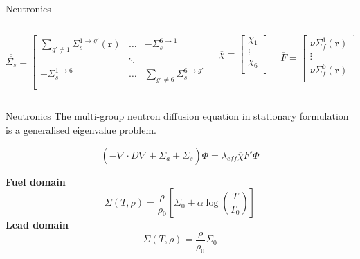 \documentclass{beamer}
\renewcommand{\vec}[1]{\ensuremath{\overline{#1}}}
\newcommand{\mtx}[1]{\ensuremath{\overline{\overline{#1}}}}
\begin{document}
\begin{frame}{Neutronics}
\begin{columns}
        \hspace*{-2em}\begin{column}{0.625\textwidth}
            \[
                \mtx{\Sigma_s} = 
                            \begin{bmatrix}
                                \sum_{g' \neq 1}\Sigma_s^{1\rightarrow g'} (\mathbf{r}) & \dots & -\Sigma_s^{6\rightarrow 1} \\
                                & \ddots & \\
                                -\Sigma_s^{1\rightarrow 6} & \dots & \sum_{g' \neq 6}\Sigma_s^{6\rightarrow g'} \\
                            \end{bmatrix}
            \]
        \end{column}
        \begin{column}{0.1\textwidth} 
            \[
                \vec{\chi} = 
                            \begin{bmatrix}
                                \chi_1\\
                                \vdots \\
                                \chi_6\\
                            \end{bmatrix}
            \]
        \end{column}
        \begin{column}{0.15\textwidth} 
                \[
                \vec{F} = 
                            \begin{bmatrix}
                                \nu \Sigma_{f}^{1} (\mathbf{r})\\
                                \vdots \\
                                \nu \Sigma_{f}^{6} (\mathbf{r})\\
                            \end{bmatrix}
            \]
        \end{column}
        
    \end{columns}
\end{frame}

\begin{frame}{Neutronics}
    The multi-group neutron diffusion equation in stationary formulation is a generalised eigenvalue problem. 
    \begin{block}{}
        \[\left ( - \nabla \cdot \mtx{D} \nabla + \mtx{\Sigma_a} + \mtx{\Sigma_s} \right ) \vec{\Phi} = \lambda_{eff} \vec{\chi} \vec{F}' \vec{\Phi}\]
    \end{block}
    \bigskip
    \textbf{Fuel domain}
        \[\Sigma(T,\rho) = \frac{\rho}{\rho_0}\left[\Sigma_0 + \alpha \log\left(\frac{T}{T_0}\right)\right]\]
    \bigskip
    \textbf{Lead domain}
        \[\Sigma(T,\rho) = \frac{\rho}{\rho_0}\Sigma_0\]
\end{frame}
\end{document}
